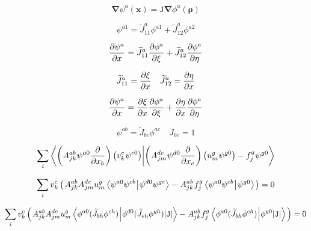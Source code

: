 \begin{equation}
   \mathbf{\nabla} \psi^{a}(\mathbf{x}) = \texttt{J} \mathbf{\nabla} \phi^{a}(\bm{\rho})
\end{equation}

\begin{equation}
   \psi^{a1} = \widetilde{J}^{a}_{11} \phi^{a1} + \widetilde{J}^{a}_{12} \phi^{a2}
\end{equation}

\begin{equation}
   \frac{\partial \psi^a}{\partial x} = \widetilde{J}^{a}_{11} \frac{\partial \phi^a}{\partial \xi} + \widetilde{J}^{a}_{12} \frac{\partial \phi^a}{\partial \eta}
\end{equation}

\begin{equation}
   \widetilde{J}^{a}_{11} = \frac{\partial \xi}{\partial x} \quad \widetilde{J}^{a}_{12} = \frac{\partial \eta}{\partial x}
\end{equation}

\begin{equation}
   \frac{\partial \psi^a}{\partial x} = \frac{\partial \xi}{\partial x} \frac{\partial \phi^a}{\partial \xi} + \frac{\partial \eta}{\partial x} \frac{\partial \phi^a}{\partial \eta}
\end{equation}

\begin{equation}
   \psi^{ab} = \widetilde{J}_{bc} \phi^{ac} \quad J_{0c} = 1
\end{equation}

\begin{equation}
   \sum_i \bra{\left(A^{ab}_{jk} \mkern1mu \psi^{a0} \frac{\partial}{\partial x_b}\right) \left(v^c_k \mkern1mu \psi^{c0}\right)}\ket{\left(A^{de}_{jm} \mkern1mu \psi^{d0} \frac{\partial}{\partial x_e}\right) \left(u^g_m \mkern1mu \psi^{g0}\right) - f^g_j \mkern1mu \psi^{g0}}
\end{equation}

\begin{equation}
   \sum_i v^c_k \left( \mkern2mu A^{ab}_{jk} A^{de}_{jm} u^g_m \bra{\psi^{a0} \psi^{cb} \mkern1mu}\ket{\mkern1mu \psi^{d0} \psi^{ge}} - \mkern1mu A^{ab}_{jk} \mkern1mu f^g_j \bra{\psi^{a0} \psi^{cb} \mkern1mu}\ket{\mkern1mu \psi^{g0}} \mkern2mu \right) = 0
\end{equation}

\begin{equation}
   \sum_i v^c_k \left( \mkern2mu A^{ab}_{jk} A^{de}_{jm} u^g_m \bra{\phi^{a0} (\widetilde{J}_{bh}  \phi^{ch}) \mkern1mu}\ket{\mkern1mu \phi^{d0} (\widetilde{J}_{eh}  \phi^{gh}) |\texttt{J}|} - \mkern1mu A^{ab}_{jk} \mkern1mu f^g_j \bra{\phi^{a0} (\widetilde{J}_{bh}  \phi^{ch}) \mkern1mu}\ket{\mkern1mu \phi^{g0} |\texttt{J}|} \mkern2mu \right) = 0
\end{equation}

